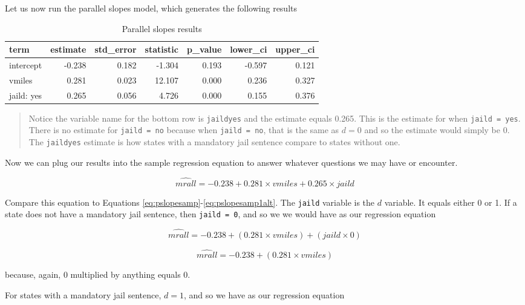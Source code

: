 \documentclass[
]{book}
\begin{document}
Let us now run the parallel slopes model, which generates the following results

\begin{table}

\caption{\label{tab:psloperesults}Parallel slopes results}
\centering
\begin{tabular}[t]{l|r|r|r|r|r|r}
\hline
term & estimate & std\_error & statistic & p\_value & lower\_ci & upper\_ci\\
\hline
intercept & -0.238 & 0.182 & -1.304 & 0.193 & -0.597 & 0.121\\
\hline
vmiles & 0.281 & 0.023 & 12.107 & 0.000 & 0.236 & 0.327\\
\hline
jaild: yes & 0.265 & 0.056 & 4.726 & 0.000 & 0.155 & 0.376\\
\hline
\end{tabular}
\end{table}

\begin{quote}
Notice the variable name for the bottom row is \texttt{jaildyes} and the estimate equals 0.265. This is the estimate for when \texttt{jaild\ =\ yes}. There is no estimate for \texttt{jaild\ =\ no} because when \texttt{jaild\ =\ no}, that is the same as \(d=0\) and so the estimate would simply be 0. The \texttt{jaildyes} estimate is how states with a mandatory jail sentence compare to states without one.
\end{quote}

Now we can plug our results into the sample regression equation to answer whatever questions we may have or encounter.

\begin{equation}
\hat{mrall} = -0.238 + 0.281\times vmiles + 0.265 \times jaild
\end{equation}

Compare this equation to Equations \eqref{eq:pslopesamp}-\eqref{eq:pslopesamp1alt}. The \texttt{jaild} variable is the \(d\) variable. It equals either 0 or 1. If a state does not have a mandatory jail sentence, then \texttt{jaild\ =\ 0}, and so we we would have as our regression equation

\[\hat{mrall} = -0.238 + (0.281\times vmiles) + (jaild \times 0)\]

\[\hat{mrall} = -0.238 + (0.281\times vmiles)\]

because, again, 0 multiplied by anything equals 0.

For states with a mandatory jail sentence, \(d=1\), and so we have as our regression equation
\end{document}
